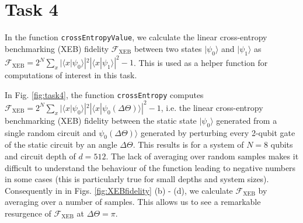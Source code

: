 \documentclass[12pt]{article}
\begin{document}
\section*{Task 4}

In the function \texttt{crossEntropyValue}, we calculate the linear cross-entropy benchmarking (XEB) fidelity $\mathcal{F}_\mathrm{XEB}$ between two states $|\psi_0\rangle$ and $|\psi_1\rangle$ as $\mathcal{F}_\mathrm{XEB} = 2^N \sum_{x} |\langle x|\psi_0\rangle|^2 |\langle x|\psi_1\rangle|^2 - 1$. This is used as a helper function for computations of interest in this task. 

In Fig. \ref{fig:task4}, the function \texttt{crossEntropy} computes $\mathcal{F}_\mathrm{XEB} = 2^N \sum_{x} |\langle x|\psi_0\rangle|^2 |\langle x|\psi_0(\Delta\Theta) \rangle|^2 - 1$, i.e. the linear cross-entropy benchmarking (XEB) fidelity between the static state $|\psi_0\rangle$ generated from a single random circuit and $\psi_0(\Delta \Theta)\rangle$ generated by perturbing every 2-qubit gate of the static circuit by an angle $\Delta \Theta$. This results is for a system of $N = 8$ qubits and circuit depth of $d = 512$. The lack of averaging over random samples makes it difficult to understand the behaviour of the function leading to negative numbers in some cases (this is particularly true for small depths and system sizes). Consequently in in Figs. \ref{fig:XEBfidelity} (b) - (d), we calculate $\mathcal{F}_\mathrm{XEB}$ by averaging over a number of samples. This allows us to see a remarkable resurgence of $\mathcal{F}_\mathrm{XEB}$ at $\Delta \Theta = \pi$.
\end{document}
